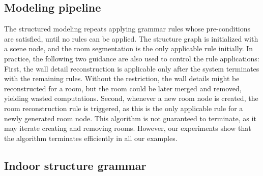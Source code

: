 


\subsection{Modeling pipeline}

The structured modeling repeats applying grammar rules whose
pre-conditions are satisfied, until no rules can be applied.  The
structure graph is initialized with a scene node, and the room
segmentation is the only applicable rule initially.  In practice, the
following two guidance are also used to control the rule applications:
First, the wall detail reconstruction is applicable only after the
system terminates with the remaining rules.  Without the restriction,
the wall details might be reconstructed for a room, but the room could
be later merged and removed, yielding wasted computations. Second,
whenever a new room node is created, the room reconstruction rule is
triggered, as this is the only applicable rule for a newly generated
room node.
This algorithm is not guaranteed to terminate, as it may iterate
creating and removing rooms. However, our experiments show that the
algorithm terminates efficiently in all our examples.


\subsection{Indoor structure grammar}

